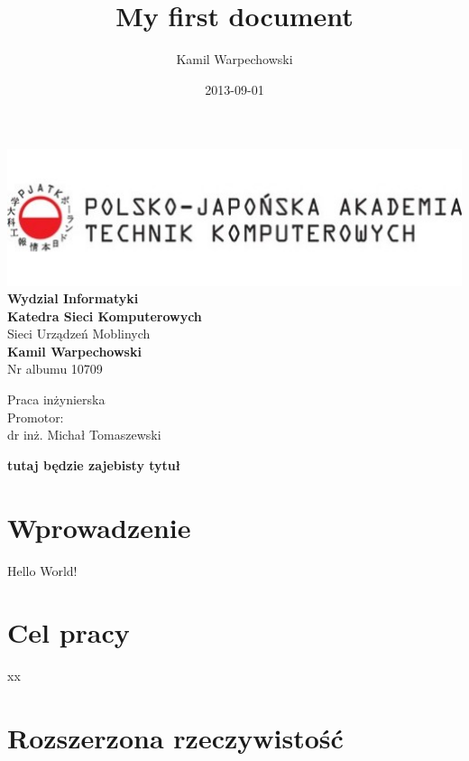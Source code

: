 \documentclass[12pt]{article}
\title{My first document}
\date{2013-09-01}
\author{Kamil Warpechowski}
\begin{document}
\thispagestyle{firststyle}
\begin{center}
\includegraphics[width=1\textwidth]{images/logo.jpg}
\textbf{Wydzial Informatyki} \\
\vspace{3em}
\textbf{Katedra Sieci Komputerowych} \\
Sieci Urządzeń Moblinych \\
\vspace{3em}
\textbf{Kamil Warpechowski} \\
Nr albumu 10709
\end{center}


\vspace{3em}
{\addtolength{\leftskip}{70mm}

\noindent
Praca inżynierska
\\Promotor:
\\dr inż. Michał Tomaszewski

}

\vspace{3em}

\textbf {
	tutaj będzie zajebisty tytuł
}



  \newpage
  
  
  \tableofcontents
  \newpage
  

\section{Wprowadzenie}

Hello World!


\section{Cel pracy}
xx
\section{Rozszerzona rzeczywistość}
\end{document}
